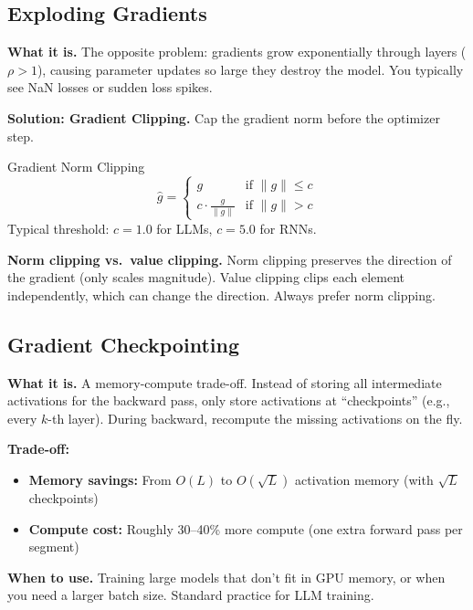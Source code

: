 \subsection{Exploding Gradients}

\textbf{What it is.} The opposite problem: gradients grow exponentially through layers ($\rho > 1$), causing parameter updates so large they destroy the model. You typically see NaN losses or sudden loss spikes.

\textbf{Solution: Gradient Clipping.} Cap the gradient norm before the optimizer step.

\begin{mathresult}{Gradient Norm Clipping}
\begin{equation}
\hat{g} = \begin{cases}
g & \text{if } \|g\| \leq c \\
c \cdot \frac{g}{\|g\|} & \text{if } \|g\| > c
\end{cases}
\end{equation}
Typical threshold: $c = 1.0$ for LLMs, $c = 5.0$ for RNNs.
\end{mathresult}

\textbf{Norm clipping vs.\ value clipping.} Norm clipping preserves the direction of the gradient (only scales magnitude). Value clipping clips each element independently, which can change the direction. Always prefer norm clipping.

\subsection{Gradient Checkpointing}

\textbf{What it is.} A memory-compute trade-off. Instead of storing all intermediate activations for the backward pass, only store activations at ``checkpoints'' (e.g., every $k$-th layer). During backward, recompute the missing activations on the fly.

\textbf{Trade-off:}
\begin{itemize}
    \item \textbf{Memory savings:} From $O(L)$ to $O(\sqrt{L})$ activation memory (with $\sqrt{L}$ checkpoints)
    \item \textbf{Compute cost:} Roughly 30--40\% more compute (one extra forward pass per segment)
\end{itemize}

\textbf{When to use.} Training large models that don't fit in GPU memory, or when you need a larger batch size. Standard practice for LLM training.

